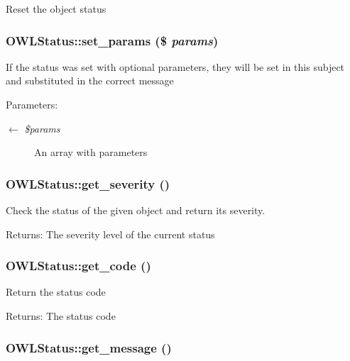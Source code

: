 Reset the object status \hypertarget{classOWLStatus_65bcaa74291e21685b0ea148dd05cb65}{
\subsubsection{\setlength{\rightskip}{0pt plus 5cm}OWLStatus::set\_\-params (\$ {\em params})}}
\label{classOWLStatus_65bcaa74291e21685b0ea148dd05cb65}


If the status was set with optional parameters, they will be set in this subject and substituted in the correct message

\begin{Desc}
\item[Parameters:]
\begin{description}
\item[\mbox{$\leftarrow$} {\em \$params}]An array with parameters \end{description}
\end{Desc}
\hypertarget{classOWLStatus_aa7e66cc43cb91798bba0599a3eef435}{
\subsubsection{\setlength{\rightskip}{0pt plus 5cm}OWLStatus::get\_\-severity ()}}
\label{classOWLStatus_aa7e66cc43cb91798bba0599a3eef435}


Check the status of the given object and return its severity.

\begin{Desc}
\item[Returns:]The severity level of the current status \end{Desc}
\hypertarget{classOWLStatus_efb4d156f33c9197d9691ab9423660fa}{
\subsubsection{\setlength{\rightskip}{0pt plus 5cm}OWLStatus::get\_\-code ()}}
\label{classOWLStatus_efb4d156f33c9197d9691ab9423660fa}


Return the status code

\begin{Desc}
\item[Returns:]The status code \end{Desc}
\hypertarget{classOWLStatus_f5711d10793d0cf375c3aa9b1a298f94}{
\subsubsection{\setlength{\rightskip}{0pt plus 5cm}OWLStatus::get\_\-message ()}}
\label{classOWLStatus_f5711d10793d0cf375c3aa9b1a298f94}


